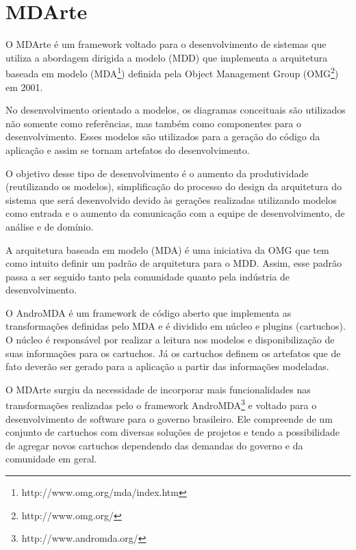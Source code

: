\chapter{MDArte}
O MDArte é um framework voltado para o desenvolvimento de sistemas que utiliza a
abordagem dirigida a modelo (MDD) que implementa a arquitetura baseada em modelo
(MDA\footnote{http://www.omg.org/mda/index.htm}) definida pela Object Management
Group (OMG\footnote{http://www.omg.org/}) em 2001.

No desenvolvimento orientado a modelos, os diagramas conceituais são utilizados
não somente como referências, mas também como componentes para o
desenvolvimento. Esses modelos são utilizados para a geração do código da
aplicação e assim se tornam artefatos do desenvolvimento.

O objetivo desse tipo de desenvolvimento é o aumento da produtividade
(reutilizando os modelos), simplificação do processo do design da arquitetura do
sistema que será desenvolvido devido às gerações realizadas utilizando modelos
como entrada e o aumento da comunicação com a equipe de desenvolvimento, de
análise e de domínio.

A arquitetura baseada em modelo (MDA) é uma iniciativa da OMG que tem como
intuito definir um padrão de arquitetura para o MDD. Assim, esse padrão passa a
ser seguido tanto pela comunidade quanto pela indústria de desenvolvimento.

O AndroMDA é um framework de código aberto que implementa as transformações
definidas pelo MDA e é dividido em núcleo e plugins (cartuchos). O núcleo é
responsável por realizar a leitura nos modelos e disponibilização de suas
informações para os cartuchos. Já os cartuchos definem os artefatos que de fato
deverão ser gerado para a aplicação a partir das informações modeladas.

O MDArte surgiu da necessidade de incorporar mais funcionalidades nas
transformações realizadas pelo o framework
AndroMDA\footnote{http://www.andromda.org/} e voltado para o desenvolvimento de
software para o governo brasileiro. Ele compreende de um conjunto de cartuchos
com diversas soluções de projetos e tendo a possibilidade de agregar novos
cartuchos dependendo das demandas do governo e da comunidade em geral. 
